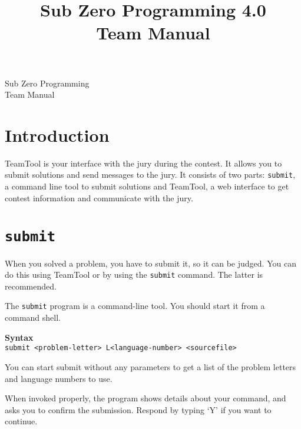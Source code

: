 \documentclass[a4paper]{artikel3}
\title{ Sub Zero Programming 4.0 \\ Team Manual }
\newcommand{\cmd}[1]{\texttt{#1}}
\newcommand{\syntax}[1]{\textbf{Syntax}\\\cmd{#1}}
\begin{document}
\begin{titlepage}
\begin{center}

\vspace{2cm}
{\Huge Sub Zero Programming} \\
\vspace{1cm}
{\Huge Team Manual} \\
\vspace{5cm}


\end{center}
\end{titlepage}


\bigskip

\vspace{-0.8cm}
\section{Introduction}

TeamTool is your interface with the jury during the contest. It allows you
to submit solutions and send messages to the jury. It consists of two parts:
\cmd{submit}, a command line tool to submit solutions and TeamTool, a web
interface to get contest information and communicate with the jury.

\vspace{-0.8cm}
\section{\cmd{submit}}

\label{sec:submit}

When you solved a problem, you have to submit it, so it can be judged. You
can do this using TeamTool or by using the \cmd{submit} command. The latter
is recommended.

The \cmd{submit} program is a command-line tool. You should start it from a
command shell.

\syntax{submit <problem-letter> L<language-number> <sourcefile>}

You can start submit without any parameters to get a list of the problem
letters and language numbers to use.

When invoked properly, the program shows details about your command, and
asks you to confirm the submission. Respond by typing `Y' if you want to
continue.
\end{document}

